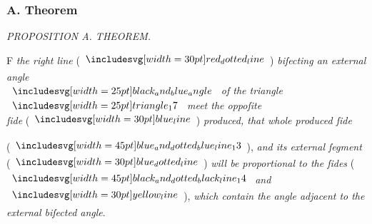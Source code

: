 \documentclass[12pt,preview]{standalone}
\begin{document}
\subsubsection{A. Theorem}

\begin{minipage}[t]{0.64\textwidth}
    \vspace{0pt}

    \begin{center}
        \textit{PROPOSITION A. THEOREM.}\label{book6prA} \\
    \end{center}

    \hfill

    \begin{center}
        \raggedright \lettrine[lines=4, loversize=1, nindent=0pt]{}{}F \textit{the right line} (\hspace{-1ex}$\dottedredline$\hspace{-1ex}) \textit{biſecting an external angle}\\ $\img{black_and_blue_angle}$ \textit{of the triangle} $\img{triangle_17}$ \textit{meet the oppoſite\\ ſide} (\hspace{-1ex}$\blueline$\hspace{-1ex}) \textit{produced, that whole produced ſide}
    \end{center}
    \raggedright (\hspace{-1ex}$\bimg{blue_and_dotted_blue_line_13}$\hspace{-1ex}), \textit{and its external ſegment} (\hspace{-1ex}$\dottedblueline$\hspace{-1ex}) \textit{will be proportional to the ſides} (\hspace{-1ex}$\bimg{black_and_dotted_black_line_14}$ \textit{and} $\yellowline$\hspace{-1ex}), \textit{which contain the angle adjacent to the external biſected angle}.

    \hfill

    \hfill


\end{minipage}
\end{document}
